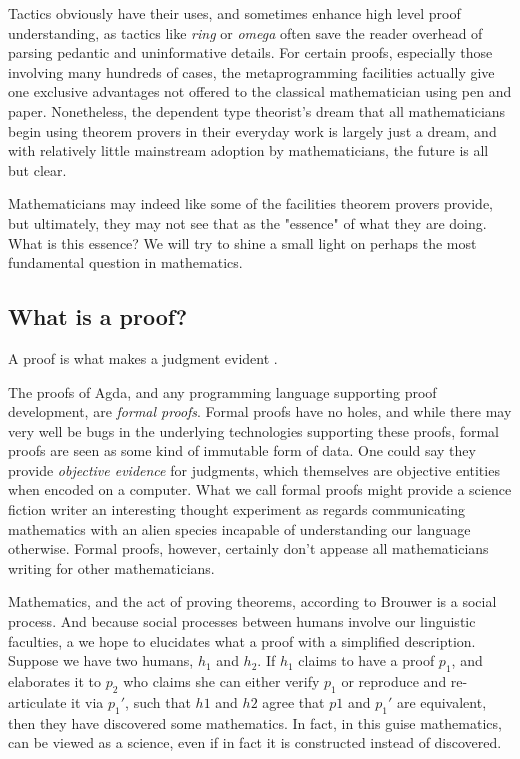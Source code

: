 Tactics obviously have their uses, and sometimes enhance high level proof
understanding, as tactics like \emph{ring} or \emph{omega} often save the reader overhead
of parsing pedantic and uninformative details. For certain proofs,
especially those involving many hundreds of cases, the metaprogramming
facilities actually give one exclusive advantages not offered to the classical
mathematician using pen and paper. Nonetheless, the dependent type theorist's
dream that all mathematicians begin using theorem provers in their everyday work
is largely just a dream, and with relatively little mainstream adoption by
mathematicians, the future is all but clear.

Mathematicians may indeed like some of the facilities theorem provers provide,
but ultimately, they may not see that as the "essence" of what they are doing.
What is this essence? We will try to shine a small light on perhaps the most
fundamental question in mathematics.

\subsection{What is a proof?}

\begin{displayquote}

A proof is what makes a judgment evident \cite{mlMeanings}.

\end{displayquote}

The proofs of Agda, and any programming language supporting proof development,
are \emph{formal proofs}. Formal proofs have no holes, and while there may very
well be bugs in the underlying technologies supporting these proofs, formal
proofs are seen as some kind of immutable form of data. One could say they
provide \emph{objective evidence} for judgments, which themselves are objective
entities when encoded on a computer. What we call formal proofs might provide a
science fiction writer an interesting thought experiment as regards
communicating mathematics with an alien species incapable of understanding our
language otherwise. Formal proofs, however, certainly don't appease all
mathematicians writing for other mathematicians.

Mathematics, and the act of proving theorems, according to Brouwer is a social
process. And because social processes between humans involve our linguistic
faculties, a we hope to elucidates what a proof with a simplified description.
Suppose we have two humans, $h_1$ and $h_2$. If $h_1$ claims to have a proof
$p_1$, and elaborates it to $p_2$ who claims she can either verify $p_1$ or
reproduce and re-articulate it via $p_1'$, such that $h1$ and $h2$ agree that
$p1$ and $p_1'$ are equivalent, then they have discovered some mathematics. In
fact, in this guise mathematics, can be viewed as a science, even if in fact it
is constructed instead of discovered.

